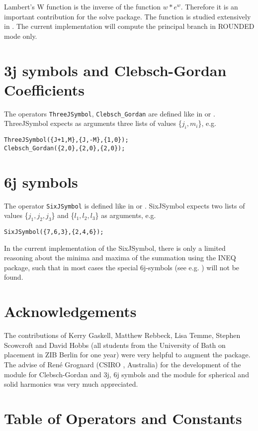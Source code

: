 \documentclass[11pt]{article}
\begin{document}
Lambert's W function is the inverse of the function  $w*e^w$.
Therefore it is an important contribution for the solve package.
The function is studied extensively in \cite{Corless:92}.  
The current implementation will compute the principal branch in
ROUNDED mode only.

\section{3j symbols and Clebsch-Gordan Coefficients}
The operators {\tt ThreeJSymbol}, {\tt Clebsch\_Gordan} are defined like 
in \cite{Landolt:68} or \cite{Edmonds:57}. ThreeJSymbol expects as arguments
three lists of values \{$j_i,m_i$\}, e.g.

\begin{verbatim}
ThreeJSymbol({J+1,M},{J,-M},{1,0});
Clebsch_Gordan({2,0},{2,0},{2,0});
\end{verbatim}

\section{6j symbols }
The operator {\tt SixJSymbol} is defined like
in \cite{Landolt:68} or \cite{Edmonds:57}.
SixJSymbol expects two lists of values \{$j_1,j_2,j_3$\} and
 \{$l_1,l_2,l_3$\} as arguments, e.g.

\begin{verbatim}
SixJSymbol({7,6,3},{2,4,6});
\end{verbatim}

In the current implementation of the SixJSymbol, there is only a limited
reasoning about the minima and maxima of the summation using
the INEQ package, such that in most
cases the special 6j-symbols (see e.g. \cite{Landolt:68})
will not be found.



\section{Acknowledgements}

The contributions of Kerry Gaskell, Matthew Rebbeck, Lisa Temme,
Stephen Scowcroft and David Hobbs (all students from the University of Bath
on placement in ZIB Berlin for one year) were very helpful
to augment the package. The advise of Ren\'e Grognard (CSIRO , Australia)
for the development of the module for Clebsch-Gordan and 3j, 6j symbols
and the module for spherical and solid harmonics was very much appreciated.

\section{Table of Operators and Constants}
\end{document}
